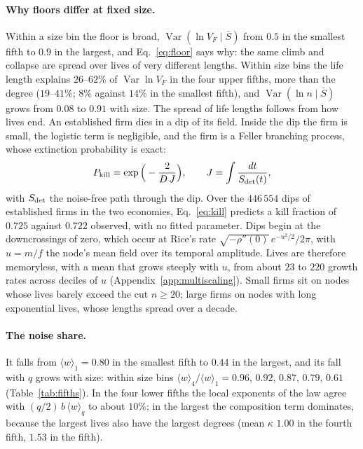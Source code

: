 \documentclass[pre,twocolumn,superscriptaddress,nofootinbib]{revtex4-2}
\newcommand{\Var}{\operatorname{Var}}
\newcommand{\Sb}{\bar S}
\begin{document}
\paragraph{Why floors differ at fixed size.}  Within a size bin the floor is broad, $\Var(\ln V_F\mid\Sb)$
from $0.5$ in the smallest fifth to $0.9$ in the largest, and Eq.~\eqref{eq:floor} says why: the same climb
and collapse are spread over lives of very different lengths.  Within size bins the life length explains
$26$--$62\%$ of $\Var\ln V_F$ in the four upper fifths, more than the degree ($19$--$41\%$; $8\%$ against
$14\%$ in the smallest fifth), and $\Var(\ln n\mid\Sb)$ grows from $0.08$ to $0.91$ with size.  The spread of
life lengths follows from how lives end.  An established firm dies in a dip of its field.  Inside the dip
the firm is small, the logistic term is negligible, and the firm is a Feller branching process, whose
extinction probability is exact:
\begin{equation}
P_{\rm kill}=\exp\Big(-\frac{2}{D\,J}\Big),\qquad J=\int\frac{dt}{S_{\rm det}(t)},
\label{eq:kill}
\end{equation}
with $S_{\rm det}$ the noise-free path through the dip.  Over the $446\,554$ dips of established firms in the
two economies, Eq.~\eqref{eq:kill} predicts a kill fraction of $0.725$ against $0.722$ observed, with no
fitted parameter.  Dips begin at the downcrossings of zero, which occur at Rice's rate
$\sqrt{-\rho''(0)}\,e^{-u^2/2}/2\pi$, with $u=m/f$ the node's mean field over its temporal amplitude.  Lives
are therefore memoryless, with a mean that grows steeply with $u$, from about $23$ to $220$ growth rates
across deciles of $u$ (Appendix~\ref{app:multiscaling}).  Small firms sit on nodes whose lives barely exceed the
cut $n\ge20$; large firms on nodes with long exponential lives, whose lengths spread over a decade.

\paragraph{The noise share.}  It falls from $\langle w\rangle_1=0.80$ in the smallest fifth to $0.44$ in the largest, and its fall
with $q$ grows with size: within size bins $\langle w\rangle_4/\langle w\rangle_1=0.96$, $0.92$, $0.87$, $0.79$, $0.61$
(Table~\ref{tab:fifths}).  In the four lower fifths the local exponents of the law agree with
$(q/2)\,b\,\langle w\rangle_q$ to about $10\%$; in the largest the composition term dominates, because the
largest lives also have the largest degrees (mean $\kappa$ $1.00$ in the fourth fifth, $1.53$ in the fifth).
\end{document}
